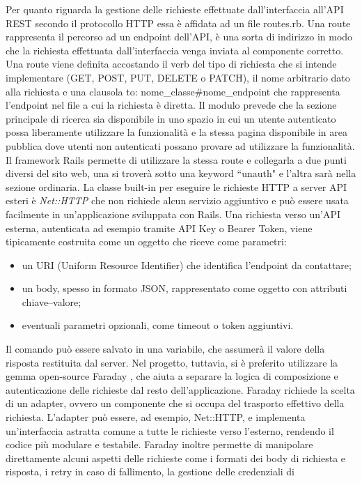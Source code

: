 \documentclass[target=bach,aauheader=,style=]{thud}
\begin{document}
Per quanto riguarda la gestione delle richieste effettuate dall'interfaccia all'API REST secondo il protocollo HTTP essa è affidata ad un file routes.rb. Una route rappresenta il percorso ad un endpoint
dell'API, è una sorta di indirizzo in modo che la richiesta effettuata dall'interfaccia venga inviata al componente corretto.
Una route viene definita accostando il verb del tipo di richiesta che si intende implementare (GET, POST, PUT, DELETE o PATCH), il nome arbitrario dato alla richiesta e una clausola to:
nome\_classe\#nome\_endpoint che rappresenta l'endpoint nel file a cui la richiesta è diretta. Il modulo prevede che la sezione principale di ricerca sia disponibile in uno spazio in
cui un utente autenticato possa liberamente utilizzare la funzionalità e la stessa pagina disponibile in area pubblica dove utenti non autenticati possano provare ad utilizzare la funzionalità.
Il framework Rails permette di utilizzare la stessa route e collegarla a due punti diversi del sito web, una si troverà sotto una keyword ``unauth" e l'altra sarà nella sezione ordinaria.
La classe built-in per eseguire le richieste HTTP a server API esteri è \textit{Net::HTTP} che non richiede alcun servizio aggiuntivo e può essere usata facilmente in un'applicazione sviluppata con Rails.
Una richiesta verso un'API esterna, autenticata ad esempio tramite API Key o Bearer Token, viene tipicamente costruita come un oggetto che riceve come parametri:
\begin{itemize}
    \item un URI (Uniform Resource Identifier) che identifica l'endpoint da contattare;
    \item un body, spesso in formato JSON, rappresentato come oggetto con attributi chiave–valore;
    \item eventuali parametri opzionali, come timeout o token aggiuntivi.
\end{itemize}
Il comando può essere salvato in una variabile, che assumerà il valore della risposta restituita dal server.
Nel progetto, tuttavia, si è preferito utilizzare la gemma open-source Faraday \cite{faraday_gem}, che aiuta a separare la logica di composizione e autenticazione delle richieste dal resto
dell'applicazione. Faraday richiede la scelta di un adapter, ovvero un componente che si occupa del trasporto effettivo della richiesta. L'adapter può essere, ad esempio, Net::HTTP, e implementa
un'interfaccia astratta comune a tutte le richieste verso l'esterno, rendendo il codice più modulare e testabile.
Faraday inoltre permette di manipolare direttamente alcuni aspetti delle richieste come i formati dei body di richiesta e risposta, i retry in caso di fallimento, la gestione delle credenziali di
\end{document}
